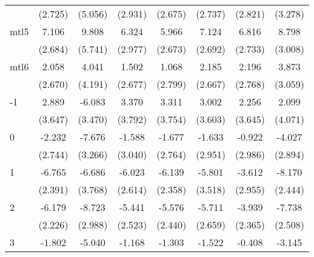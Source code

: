 \documentclass{article}
\begin{document}
{\begin{longtable}{l*{7}{c}}
                &  (2.725)         &  (5.056)         &  (2.931)         &  (2.675)         &  (2.737)         &  (2.821)         &  (3.278)         \\
mtl5            &    7.106\sym{*}  &    9.808         &    6.324\sym{*}  &    5.966\sym{*}  &    7.124\sym{*}  &    6.816\sym{*}  &    8.798\sym{**} \\
                &  (2.684)         &  (5.741)         &  (2.977)         &  (2.673)         &  (2.692)         &  (2.733)         &  (3.008)         \\
mtl6            &    2.058         &    4.041         &    1.502         &    1.068         &    2.185         &    2.196         &    3.873         \\
                &  (2.670)         &  (4.191)         &  (2.677)         &  (2.799)         &  (2.667)         &  (2.768)         &  (3.059)         \\
-1              &    2.889         &   -6.083         &    3.370         &    3.311         &    3.002         &    2.256         &    2.099         \\
                &  (3.647)         &  (3.470)         &  (3.792)         &  (3.754)         &  (3.603)         &  (3.645)         &  (4.071)         \\
0               &   -2.232         &   -7.676\sym{*}  &   -1.588         &   -1.677         &   -1.633         &   -0.922         &   -4.027         \\
                &  (2.744)         &  (3.266)         &  (3.040)         &  (2.764)         &  (2.951)         &  (2.986)         &  (2.894)         \\
1               &   -6.765\sym{**} &   -6.686         &   -6.023\sym{*}  &   -6.139\sym{*}  &   -5.801         &   -3.612         &   -8.170\sym{**} \\
                &  (2.391)         &  (3.768)         &  (2.614)         &  (2.358)         &  (3.518)         &  (2.955)         &  (2.444)         \\
2               &   -6.179\sym{**} &   -8.723\sym{**} &   -5.441\sym{*}  &   -5.576\sym{*}  &   -5.711\sym{*}  &   -3.939         &   -7.738\sym{**} \\
                &  (2.226)         &  (2.988)         &  (2.523)         &  (2.440)         &  (2.659)         &  (2.365)         &  (2.508)         \\
3               &   -1.802         &   -5.040         &   -1.168         &   -1.303         &   -1.522         &   -0.408         &   -3.145         \\

\end{longtable}}
\end{document}
